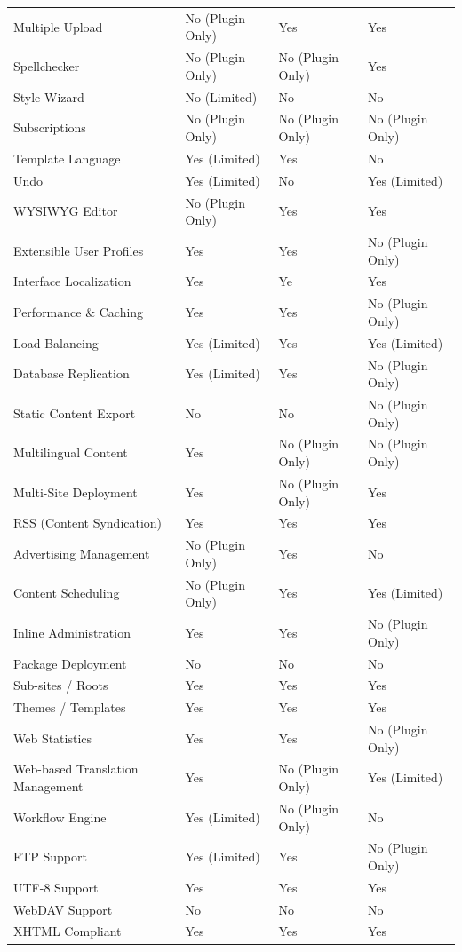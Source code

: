 \documentclass[12pt]{report}
\begin{document}
\begin{longtable}[H]{|| p{.3\linewidth} | p{.19\linewidth} | p{.19\linewidth} | p{.19\linewidth} ||}
Multiple Upload & No (Plugin Only) & Yes & Yes \\
Spellchecker & No (Plugin Only) & No (Plugin Only) & Yes \\
Style Wizard & No (Limited) & No & No \\
Subscriptions & No (Plugin Only) & No (Plugin Only) & No (Plugin Only) \\
Template Language & Yes (Limited) & Yes & No \\
Undo & Yes (Limited) & No & Yes (Limited) \\
WYSIWYG Editor & No (Plugin Only) & Yes & Yes \\
Extensible User Profiles & Yes & Yes & No (Plugin Only) \\
Interface Localization & Yes & Ye & Yes \\
Performance \& Caching & Yes & Yes & No (Plugin Only) \\
Load Balancing & Yes (Limited) & Yes & Yes (Limited) \\
Database Replication & Yes (Limited) & Yes & No (Plugin Only) \\
Static Content Export & No & No & No (Plugin Only) \\
Multilingual Content & Yes & No (Plugin Only) & No (Plugin Only) \\
Multi-Site Deployment & Yes & No (Plugin Only) & Yes \\
RSS (Content Syndication) & Yes & Yes & Yes \\
Advertising Management & No (Plugin Only) & Yes & No \\
Content Scheduling & No (Plugin Only) & Yes & Yes (Limited) \\
Inline Administration & Yes & Yes & No (Plugin Only) \\
Package Deployment & No & No & No \\
Sub-sites / Roots & Yes & Yes & Yes \\
Themes / Templates & Yes & Yes & Yes \\
Web Statistics & Yes & Yes & No (Plugin Only) \\
Web-based Translation Management & Yes & No (Plugin Only) & Yes (Limited) \\
Workflow Engine & Yes (Limited) & No (Plugin Only) & No \\
FTP Support & Yes (Limited) & Yes & No (Plugin Only) \\
UTF-8 Support & Yes & Yes & Yes \\
WebDAV Support & No & No & No \\
XHTML Compliant & Yes & Yes & Yes \\

\end{longtable}
\end{document}
